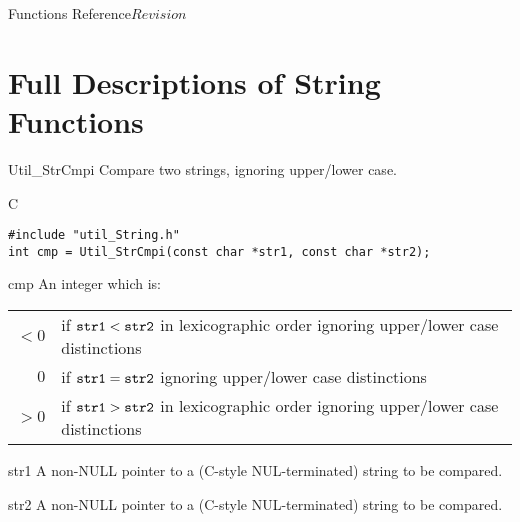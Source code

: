 \begin{cactuspart}{ Functions Reference}{}{$Revision$}

\chapter{Full Descriptions of String Functions}


\begin{FunctionDescription}{Util\_StrCmpi}
\label{Util-StrCmpi}
Compare two strings, ignoring upper/lower case.

\begin{SynopsisSection}
\begin{Synopsis}{C}
\begin{verbatim}
#include "util_String.h"
int cmp = Util_StrCmpi(const char *str1, const char *str2);
\end{verbatim}
\end{Synopsis}
\end{SynopsisSection}

\begin{ResultSection}
\begin{Result}{cmp}
An integer which is:\\
\begin{tabular}{@{}rl}
$<0$	& if $\texttt{str1} < \texttt{str2}$ in lexicographic order
	  ignoring upper/lower case distinctions			\\
$0$	& if $\texttt{str1} = \texttt{str2}$
	  ignoring upper/lower case distinctions			\\
$>0$	& if $\texttt{str1} > \texttt{str2}$ in lexicographic order
	  ignoring upper/lower case distinctions			%
\end{tabular}
\end{Result}
\end{ResultSection}

\begin{ParameterSection}
\begin{Parameter}{str1}
A non-NULL pointer to a (C-style NUL-terminated) string to be compared.
\end{Parameter}
\begin{Parameter}{str2}
A non-NULL pointer to a (C-style NUL-terminated) string to be compared.
\end{Parameter}
\end{ParameterSection}


\end{FunctionDescription}
\end{cactuspart}
